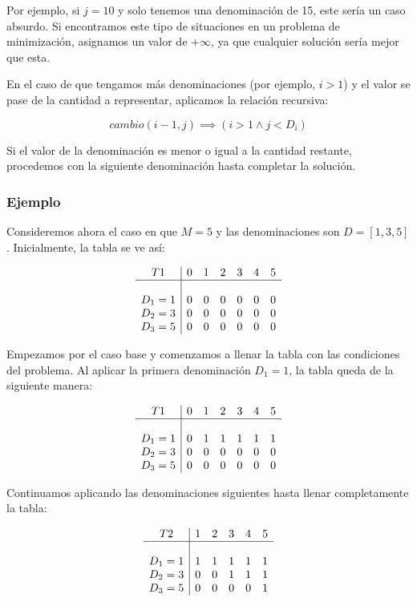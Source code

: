 \documentclass[tikz,11pt,fleqn]{book} %
\begin{document}
Por ejemplo, si $j=10$ y solo tenemos una denominación de 15, este sería un caso absurdo. Si encontramos este tipo de situaciones en un problema de minimización, asignamos un valor de $+\infty$, ya que cualquier solución sería mejor que esta.

En el caso de que tengamos más denominaciones (por ejemplo, $i > 1$) y el valor se pase de la cantidad a representar, aplicamos la relación recursiva:

$$
	cambio(i-1, j) \implies (i > 1 \land j < D_i)
$$

Si el valor de la denominación es menor o igual a la cantidad restante, procedemos con la siguiente denominación hasta completar la solución.

\subsubsection{Ejemplo}

Consideremos ahora el caso en que $M=5$ y las denominaciones son $D=[1, 3, 5]$. Inicialmente, la tabla se ve así:

\[
	\begin{array}{c|cccccc}
		T1    & 0 & 1 & 2 & 3 & 4 & 5 \\
		\hline                        \\
		D_1=1 & 0 & 0 & 0 & 0 & 0 & 0 \\
		D_2=3 & 0 & 0 & 0 & 0 & 0 & 0 \\
		D_3=5 & 0 & 0 & 0 & 0 & 0 & 0 \\
	\end{array}
\]

Empezamos por el caso base y comenzamos a llenar la tabla con las condiciones del problema. Al aplicar la primera denominación $D_1=1$, la tabla queda de la siguiente manera:

\[
	\begin{array}{c|cccccc}
		T1    & 0 & 1 & 2 & 3 & 4 & 5 \\
		\hline                        \\
		D_1=1 & 0 & 1 & 1 & 1 & 1 & 1 \\
		D_2=3 & 0 & 0 & 0 & 0 & 0 & 0 \\
		D_3=5 & 0 & 0 & 0 & 0 & 0 & 0 \\
	\end{array}
\]

Continuamos aplicando las denominaciones siguientes hasta llenar completamente la tabla:

\[
	\begin{array}{c|cccccc}
		T2    & 1 & 2 & 3 & 4 & 5 \\
		\hline                    \\
		D_1=1 & 1 & 1 & 1 & 1 & 1 \\
		D_2=3 & 0 & 0 & 1 & 1 & 1 \\
		D_3=5 & 0 & 0 & 0 & 0 & 1 \\
	\end{array}
\]
\end{document}
